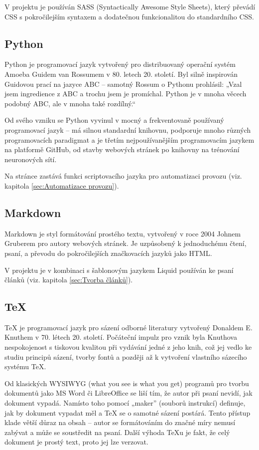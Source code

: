 \documentclass[a4paper, 12pt]{article}
\begin{document}
  V projektu je používán SASS (Syntactically Awesome Style Sheets), který převádí CSS s pokročilejším syntaxem a dodatečnou funkcionalitou do standardního CSS.


  \subsection{Python} \label{sec:Python}
  Python je programovací jazyk vytvořený pro distribuovaný operační systém Amoeba Guidem van Rossumem v 80. letech 20. století. Byl silně inspirován Guidovou prací na jazyce ABC -- samotný Rossum o Pythonu prohlásil: „Vzal jsem ingredience z ABC a trochu jsem je promíchal. Python je v mnoha věcech podobný ABC, ale v mnoha také rozdílný.\cite{making-of-python}“

  Od svého vzniku se Python vyvinul v mocný a frekventovaně používaný programovací jazyk -- má silnou standardní knihovnu, podporuje mnoho různých programovacích paradigmat a je třetím nejpoužívanějším programovacím jazykem na platformě GitHub\cite{github-statistics}, od stavby webových stránek po knihovny na trénování neuronových sítí.

  Na stránce zastává funkci scriptovacího jazyka pro automatizaci provozu (viz. kapitola \ref{sec:Automatizace provozu}).


  \subsection{Markdown} \label{sec:Markdown}
  Markdown je styl formátování prostého textu, vytvořený v roce 2004 Johnem Gruberem pro autory webových stránek. Je uzpůsobený k jednoduchému čtení, psaní, a převodu do pokročilejších značkovacích jazyků jako HTML\cite{markdown-history}.

  V projektu je v kombinaci s šablonovým jazykem Liquid používán ke psaní článků (viz. kapitola \ref{sec:Tvorba článků}).


  \subsection{\TeX} \label{sec:TeX}
  \TeX{} je programovací jazyk pro sázení odborné literatury vytvořený Donaldem E. Knuthem v 70. létech 20. století. Počáteční impulz pro vznik byla Knuthova nespokojenost s tiskovou kvalitou při vydávání jedné z jeho knih, což jej vedlo ke studiu principů sázení, tvorby fontů a později až k vytvoření vlastního sázecího systému \TeX\cite{tex-history}.

  Od klasických WYSIWYG (what you see is what you get) programů pro tvorbu dokumentů jako MS Word či LibreOffice se liší tím, že autor při psaní nevidí, jak dokument vypadá. Namísto toho pomocí „maker” (souborů instrukcí) definuje, jak by dokument vypadat měl a \TeX{} se o samotné sázení postárá. Tento přístup klade větší důraz na obsah -- autor se formátováním do značné míry nemusí zabývat a může se soustředit na psaní. Další výhoda \TeX u je fakt, že celý dokument je prostý text, proto jej lze verzovat.
\end{document}
